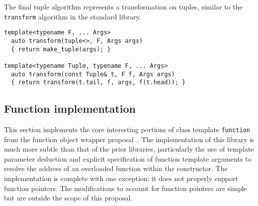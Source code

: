 \documentclass{article}
\begin{document}
The final tuple algorithm represents a transformation on tuples,
similar to the {\tt transform} algorithm in the standard library.
\begin{verbatim}
template<typename F, ... Args>
  auto transform(tuple<>, F, Args args)
  { return make_tuple(args); }

template<typename Tuple, typename F, ... Args>
  auto transform(const Tuple& t, F f, Args args)
  { return transform(t.tail, f, args, f(t.head)); }
\end{verbatim}

\subsection{Function implementation}
\label{functionimpl}
This section implements the core interesting portions of class
template {\tt function} from the function object wrapper
proposal~\cite{Gregor02}. The implementation of this library is much
more subtle than that of the prior libraries, particularly the use of
template parameter deduction and explicit specification of function
template arguments to resolve the address of an overloaded function
within the constructor. The implementation is complete with one
exception: it does not properly support function pointers. The
modifications to account for function pointers are simple but are
outside the scope of this proposal.
\end{document}

